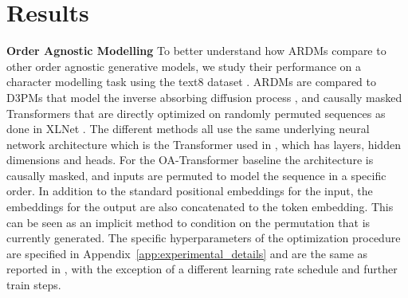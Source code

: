 \documentclass{article} \usepackage{iclr2022_conference,times}
\begin{document}
\section{Results}
\label{sec:results}
\textbf{Order Agnostic Modelling} \hspace{.15cm}
To better understand how ARDMs compare to other order agnostic generative models, we study their performance on a character modelling task using the text8 dataset \citep{mahoney2011large}.
ARDMs are compared to D3PMs that model the inverse absorbing diffusion process \citep{austin2021structured}, and causally masked Transformers that are directly optimized on randomly permuted sequences as done in XLNet \citep{yang2019xlnet}. The different methods all use the same underlying neural network architecture which is the Transformer used in \citep{austin2021structured}, which has  layers,  hidden dimensions and  heads. For the OA-Transformer baseline the architecture is causally masked, and inputs are permuted to model the sequence in a specific order. In addition to the standard positional embeddings for the input, the embeddings for the output are also concatenated to the token embedding. This can be seen as an implicit method to condition on the permutation that is currently generated. The specific hyperparameters of the optimization procedure are specified in Appendix~\ref{app:experimental_details} and are the same as reported in \citep{austin2021structured}, with the exception of a different learning rate schedule and further train steps.
\end{document}
